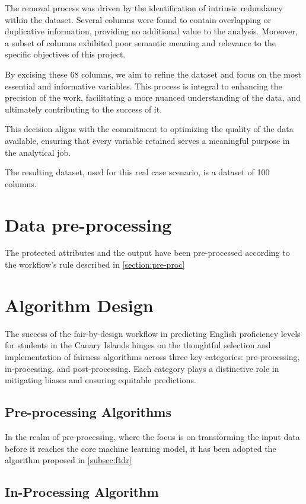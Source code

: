 \documentclass[12pt,a4paper,openright,twoside]{book}
\begin{document}
The removal process was driven by the identification of intrinsic redundancy within the dataset. Several columns were found to contain overlapping or duplicative information, providing no additional value to the analysis. Moreover, a subset of columns exhibited poor semantic meaning and relevance to the specific objectives of this project.

By excising these 68 columns, we aim to refine the dataset and focus on the most essential and informative variables. This process is integral to enhancing the precision of the work, facilitating a more nuanced understanding of the data, and ultimately contributing to the success of it.

This decision aligns with the commitment to optimizing the quality of the data available, ensuring that every variable retained serves a meaningful purpose in the analytical job. 

The resulting dataset, used for this real case scenario, is a dataset of 100 columns.

\section{Data pre-processing}

The protected attributes and the output have been pre-processed according to the workflow's rule described in \cref{section:pre-proc}

\section{Algorithm Design}

The success of the fair-by-design workflow in predicting English proficiency levels for students in the Canary Islands hinges on the thoughtful selection and implementation of fairness algorithms across three key categories: pre-processing, in-processing, and post-processing. Each category plays a distinctive role in mitigating biases and ensuring equitable predictions.

\subsection{Pre-processing Algorithms}

In the realm of pre-processing, where the focus is on transforming the input data before it reaches the core machine learning model, it has been adopted the algorithm proposed in \cref{subsec:ftdr}

\subsection{In-Processing Algorithm}
\end{document}
